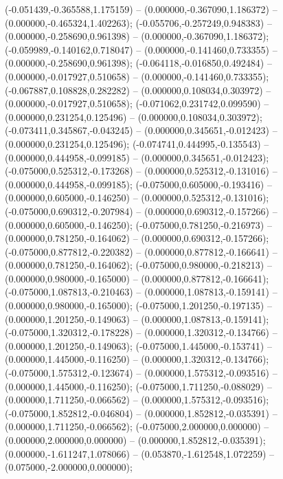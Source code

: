  (-0.051439,-0.365588,1.175159) -- (0.000000,-0.367090,1.186372) -- (0.000000,-0.465324,1.402263);
 (-0.055706,-0.257249,0.948383) -- (0.000000,-0.258690,0.961398) -- (0.000000,-0.367090,1.186372);
 (-0.059989,-0.140162,0.718047) -- (0.000000,-0.141460,0.733355) -- (0.000000,-0.258690,0.961398);
 (-0.064118,-0.016850,0.492484) -- (0.000000,-0.017927,0.510658) -- (0.000000,-0.141460,0.733355);
 (-0.067887,0.108828,0.282282) -- (0.000000,0.108034,0.303972) -- (0.000000,-0.017927,0.510658);
 (-0.071062,0.231742,0.099590) -- (0.000000,0.231254,0.125496) -- (0.000000,0.108034,0.303972);
 (-0.073411,0.345867,-0.043245) -- (0.000000,0.345651,-0.012423) -- (0.000000,0.231254,0.125496);
 (-0.074741,0.444995,-0.135543) -- (0.000000,0.444958,-0.099185) -- (0.000000,0.345651,-0.012423);
 (-0.075000,0.525312,-0.173268) -- (0.000000,0.525312,-0.131016) -- (0.000000,0.444958,-0.099185);
 (-0.075000,0.605000,-0.193416) -- (0.000000,0.605000,-0.146250) -- (0.000000,0.525312,-0.131016);
 (-0.075000,0.690312,-0.207984) -- (0.000000,0.690312,-0.157266) -- (0.000000,0.605000,-0.146250);
 (-0.075000,0.781250,-0.216973) -- (0.000000,0.781250,-0.164062) -- (0.000000,0.690312,-0.157266);
 (-0.075000,0.877812,-0.220382) -- (0.000000,0.877812,-0.166641) -- (0.000000,0.781250,-0.164062);
 (-0.075000,0.980000,-0.218213) -- (0.000000,0.980000,-0.165000) -- (0.000000,0.877812,-0.166641);
 (-0.075000,1.087813,-0.210463) -- (0.000000,1.087813,-0.159141) -- (0.000000,0.980000,-0.165000);
 (-0.075000,1.201250,-0.197135) -- (0.000000,1.201250,-0.149063) -- (0.000000,1.087813,-0.159141);
 (-0.075000,1.320312,-0.178228) -- (0.000000,1.320312,-0.134766) -- (0.000000,1.201250,-0.149063);
 (-0.075000,1.445000,-0.153741) -- (0.000000,1.445000,-0.116250) -- (0.000000,1.320312,-0.134766);
 (-0.075000,1.575312,-0.123674) -- (0.000000,1.575312,-0.093516) -- (0.000000,1.445000,-0.116250);
 (-0.075000,1.711250,-0.088029) -- (0.000000,1.711250,-0.066562) -- (0.000000,1.575312,-0.093516);
 (-0.075000,1.852812,-0.046804) -- (0.000000,1.852812,-0.035391) -- (0.000000,1.711250,-0.066562);
 (-0.075000,2.000000,0.000000) -- (0.000000,2.000000,0.000000) -- (0.000000,1.852812,-0.035391);
 (0.000000,-1.611247,1.078066) -- (0.053870,-1.612548,1.072259) -- (0.075000,-2.000000,0.000000);
